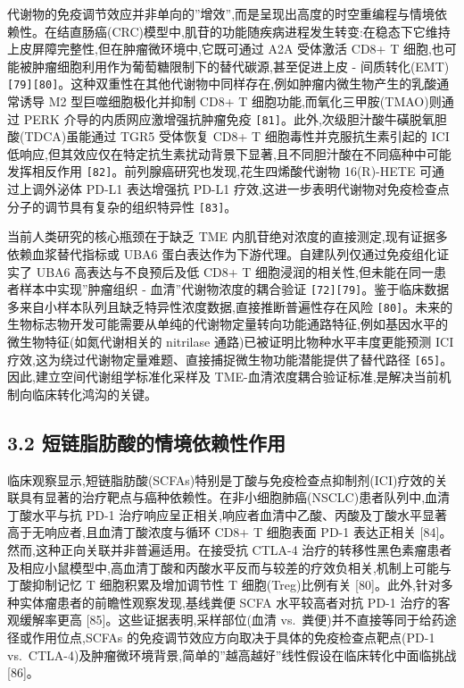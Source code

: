 \documentclass[11pt]{article}
\begin{document}
代谢物的免疫调节效应并非单向的''增效'',而是呈现出高度的时空重编程与情境依赖性。在结直肠癌(CRC)模型中,肌苷的功能随疾病进程发生转变:在稳态下它维持上皮屏障完整性,但在肿瘤微环境中,它既可通过 A2A 受体激活 CD8+ T 细胞,也可能被肿瘤细胞利用作为葡萄糖限制下的替代碳源,甚至促进上皮 - 间质转化(EMT) \texttt{{[}79{]}{[}80{]}}。这种双重性在其他代谢物中同样存在,例如肿瘤内微生物产生的乳酸通常诱导 M2 型巨噬细胞极化并抑制 CD8+ T 细胞功能,而氧化三甲胺(TMAO)则通过 PERK 介导的内质网应激增强抗肿瘤免疫 \texttt{{[}81{]}}。此外,次级胆汁酸牛磺脱氧胆酸(TDCA)虽能通过 TGR5 受体恢复 CD8+ T 细胞毒性并克服抗生素引起的 ICI 低响应,但其效应仅在特定抗生素扰动背景下显著,且不同胆汁酸在不同癌种中可能发挥相反作用 \texttt{{[}82{]}}。前列腺癌研究也发现,花生四烯酸代谢物 16(R)-HETE 可通过上调外泌体 PD-L1 表达增强抗 PD-L1 疗效,这进一步表明代谢物对免疫检查点分子的调节具有复杂的组织特异性 \texttt{{[}83{]}}。

当前人类研究的核心瓶颈在于缺乏 TME 内肌苷绝对浓度的直接测定,现有证据多依赖血浆替代指标或 UBA6 蛋白表达作为下游代理。自建队列仅通过免疫组化证实了 UBA6 高表达与不良预后及低 CD8+ T 细胞浸润的相关性,但未能在同一患者样本中实现''肿瘤组织 - 血清''代谢物浓度的耦合验证 \texttt{{[}72{]}{[}79{]}}。鉴于临床数据多来自小样本队列且缺乏特异性浓度数据,直接推断普遍性存在风险 \texttt{{[}80{]}}。未来的生物标志物开发可能需要从单纯的代谢物定量转向功能通路特征,例如基因水平的微生物特征(如氮代谢相关的 nitrilase 通路)已被证明比物种水平丰度更能预测 ICI 疗效,这为绕过代谢物定量难题、直接捕捉微生物功能潜能提供了替代路径 \texttt{{[}65{]}}。因此,建立空间代谢组学标准化采样及 TME-血清浓度耦合验证标准,是解决当前机制向临床转化鸿沟的关键。

\subsection{3.2 短链脂肪酸的情境依赖性作用}\label{ux77edux94feux8102ux80aaux9178ux7684ux60c5ux5883ux4f9dux8d56ux6027ux4f5cux7528}

临床观察显示,短链脂肪酸(SCFAs)特别是丁酸与免疫检查点抑制剂(ICI)疗效的关联具有显著的治疗靶点与癌种依赖性。在非小细胞肺癌(NSCLC)患者队列中,血清丁酸水平与抗 PD-1 治疗响应呈正相关,响应者血清中乙酸、丙酸及丁酸水平显著高于无响应者,且血清丁酸浓度与循环 CD8+ T 细胞表面 PD-1 表达正相关 {[}84{]}。然而,这种正向关联并非普遍适用。在接受抗 CTLA-4 治疗的转移性黑色素瘤患者及相应小鼠模型中,高血清丁酸和丙酸水平反而与较差的疗效负相关,机制上可能与丁酸抑制记忆 T 细胞积累及增加调节性 T 细胞(Treg)比例有关 {[}80{]}。此外,针对多种实体瘤患者的前瞻性观察发现,基线粪便 SCFA 水平较高者对抗 PD-1 治疗的客观缓解率更高 {[}85{]}。这些证据表明,采样部位(血清 vs.~粪便)并不直接等同于给药途径或作用位点,SCFAs 的免疫调节效应方向取决于具体的免疫检查点靶点(PD-1 vs.~CTLA-4)及肿瘤微环境背景,简单的''越高越好''线性假设在临床转化中面临挑战 {[}86{]}。
\end{document}
